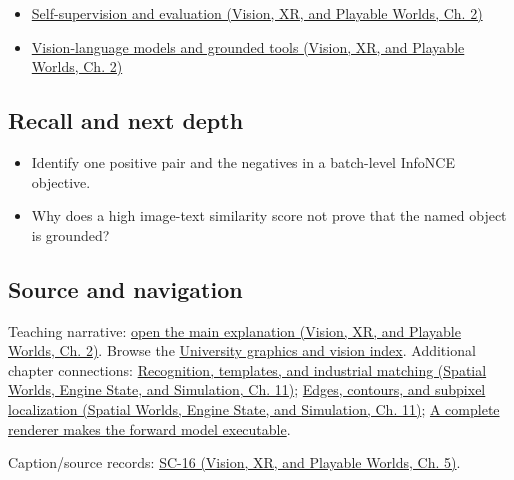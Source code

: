 \hypertarget{appendix-772f1fd96148-full-teaching-explanation}{}

\begin{itemize}
\tightlist
\item
  \href{../07-Vision-XR-and-Playable-Worlds/main.pdf\#nameddest=04-visual-computing-ii-ch031-self-supervision-and-evaluation}{Self-supervision and evaluation (Vision, XR, and Playable Worlds, Ch. 2)}
\item
  \href{../07-Vision-XR-and-Playable-Worlds/main.pdf\#nameddest=04-visual-computing-ii-ch031-vision-language-models-and-grounded-tools}{Vision-language models and grounded tools (Vision, XR, and Playable Worlds, Ch. 2)}
\end{itemize}

\subsection{Recall and next depth}\label{appendix-772f1fd96148-recall-and-next-depth}

\hypertarget{appendix-772f1fd96148-recall-and-next-depth}{}

\begin{itemize}
\tightlist
\item
  Identify one positive pair and the negatives in a batch-level InfoNCE objective.
\item
  Why does a high image-text similarity score not prove that the named object is grounded?
\end{itemize}

\subsection{Source and navigation}\label{appendix-772f1fd96148-source-and-navigation}

\hypertarget{appendix-772f1fd96148-source-and-navigation}{}

Teaching narrative: \href{../07-Vision-XR-and-Playable-Worlds/main.pdf\#nameddest=04-visual-computing-ii-ch031-self-supervision-and-evaluation}{open the main explanation (Vision, XR, and Playable Worlds, Ch. 2)}. Browse the \hyperref[appendix-a6d556a4ef50-university-graphics-vision-and-photography---independent-series]{University graphics and vision index}. Additional chapter connections: \href{../05-Spatial-Worlds-Engine-State-and-Simulation/main.pdf\#nameddest=04-visual-computing-ii-ch030-recognition-templates-and-industrial-matching}{Recognition, templates, and industrial matching (Spatial Worlds, Engine State, and Simulation, Ch. 11)}; \href{../05-Spatial-Worlds-Engine-State-and-Simulation/main.pdf\#nameddest=04-visual-computing-ii-ch030-edges-contours-and-subpixel-localization}{Edges, contours, and subpixel localization (Spatial Worlds, Engine State, and Simulation, Ch. 11)}; \hyperref[04-visual-computing-ii-ch035-a-complete-renderer-makes-the-forward-model-executable]{A complete renderer makes the forward model executable}.

Caption/source records: \href{../07-Vision-XR-and-Playable-Worlds/main.pdf\#nameddest=04-visual-computing-ii-ch036-sc-16---stanford-cs231n-deep-learning-for-computer-vision-spring-2025-lecture-16-vision-and-language}{SC-16 (Vision, XR, and Playable Worlds, Ch. 5)}.
